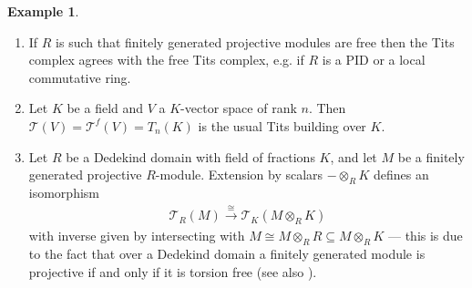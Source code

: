 \documentclass[12pt, reqno]{amsart}
\theoremstyle{plain}
\theoremstyle{definition}
\newtheorem{example}[theorem]{Example}
\begin{document}
\begin{example}\label{examples}\ 
\begin{enumerate}
\item If $R$ is such that finitely generated projective modules are free then the Tits complex agrees with the free Tits complex, e.g. if $R$ is a PID or a local commutative ring.
\item Let $K$ be a field and $V$ a $K$-vector space of rank $n$. Then $\mathcal{T}(V)=\mathcal{T}^f(V)=T_n(K)$ is the usual Tits building over $K$.
\item Let $R$ be a Dedekind domain with field of fractions $K$, and let $M$ be a finitely generated projective $R$-module. Extension by scalars $-\otimes_RK$ defines an isomorphism
\begin{align*}
\mathcal{T}_R(M)\xrightarrow{\cong} \mathcal{T}_K(M\otimes_R K)
\end{align*}
with inverse given by intersecting with $M\cong M\otimes_R R\subseteq M\otimes_R K$ --- this is due to the fact that over a Dedekind domain a finitely generated module is projective if and only if it is torsion free (see also \cite[Remark 2.8]{MillerPatztWilsonYasaki}).\qedhere 

\end{enumerate}
\end{example}
\end{document}
